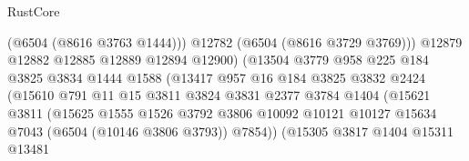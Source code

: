 \begin{lexlean}{RustCore}
\begin{coremodule}
                                          (@6504 (@8616 @3763 @1444)))
                                        @12782
                                        (@6504 (@8616 @3729 @3769)))
                                      @12879
                                      @12882
                                      @12885
                                      @12889
                                      @12894
                                      @12900)
                                    (@13504
                                      @3779
                                      @958
                                      @225
                                      @184
                                      @3825
                                      @3834
                                      @1444
                                      @1588
                                      (@13417
                                        @957
                                        @16
                                        @184
                                        @3825
                                        @3832
                                        @2424
                                        (@15610
                                          @791
                                          @11
                                          @15
                                          @3811
                                          @3824
                                          @3831
                                          @2377
                                          @3784
                                          @1404
                                          (@15621
                                            @3811
                                            (@15625
                                              @1555
                                              @1526
                                              @3792
                                              @3806
                                              @10092
                                              @10121
                                              @10127
                                              @15634
                                              @7043
                                              (@6504 (@10146 @3806 @3793))
                                              @7854))
                                          (@15305
                                            @3817
                                            @1404
                                            @15311
                                            @13481

\end{coremodule}
\end{lexlean}
